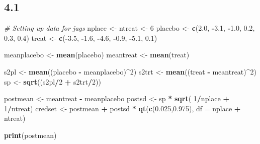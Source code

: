 \documentclass[
]{article}
\newenvironment{Shaded}{\begin{snugshade}}{\end{snugshade}}
\newcommand{\AttributeTok}[1]{\textcolor[rgb]{0.13,0.29,0.53}{#1}}
\newcommand{\CommentTok}[1]{\textcolor[rgb]{0.56,0.35,0.01}{\textit{#1}}}
\newcommand{\DecValTok}[1]{\textcolor[rgb]{0.00,0.00,0.81}{#1}}
\newcommand{\FloatTok}[1]{\textcolor[rgb]{0.00,0.00,0.81}{#1}}
\newcommand{\FunctionTok}[1]{\textcolor[rgb]{0.13,0.29,0.53}{\textbf{#1}}}
\newcommand{\NormalTok}[1]{#1}
\newcommand{\OtherTok}[1]{\textcolor[rgb]{0.56,0.35,0.01}{#1}}
\newcommand{\SpecialCharTok}[1]{\textcolor[rgb]{0.81,0.36,0.00}{\textbf{#1}}}
\begin{document}
\subsection{4.1}\label{section-1}

\begin{Shaded}
\begin{Highlighting}[]
  \CommentTok{\# Setting up data for jags}
\NormalTok{  nplace }\OtherTok{\textless{}{-}}\NormalTok{ ntreat }\OtherTok{\textless{}{-}} \DecValTok{6}
\NormalTok{  placebo }\OtherTok{\textless{}{-}} \FunctionTok{c}\NormalTok{(}\FloatTok{2.0}\NormalTok{, }\SpecialCharTok{{-}}\FloatTok{3.1}\NormalTok{, }\SpecialCharTok{{-}}\FloatTok{1.0}\NormalTok{, }\FloatTok{0.2}\NormalTok{, }\FloatTok{0.3}\NormalTok{, }\FloatTok{0.4}\NormalTok{)}
\NormalTok{  treat    }\OtherTok{\textless{}{-}} \FunctionTok{c}\NormalTok{(}\SpecialCharTok{{-}}\FloatTok{3.5}\NormalTok{, }\SpecialCharTok{{-}}\FloatTok{1.6}\NormalTok{, }\SpecialCharTok{{-}}\FloatTok{4.6}\NormalTok{, }\SpecialCharTok{{-}}\FloatTok{0.9}\NormalTok{, }\SpecialCharTok{{-}}\FloatTok{5.1}\NormalTok{, }\FloatTok{0.1}\NormalTok{)}
   
\NormalTok{  meanplacebo }\OtherTok{\textless{}{-}} \FunctionTok{mean}\NormalTok{(placebo)}
\NormalTok{  meantreat }\OtherTok{\textless{}{-}} \FunctionTok{mean}\NormalTok{(treat)}
  
\NormalTok{  s2pl   }\OtherTok{\textless{}{-}} \FunctionTok{mean}\NormalTok{((placebo }\SpecialCharTok{{-}}\NormalTok{ meanplacebo)}\SpecialCharTok{\^{}}\DecValTok{2}\NormalTok{)}
\NormalTok{  s2trt   }\OtherTok{\textless{}{-}} \FunctionTok{mean}\NormalTok{((treat }\SpecialCharTok{{-}}\NormalTok{ meantreat)}\SpecialCharTok{\^{}}\DecValTok{2}\NormalTok{)}
\NormalTok{  sp    }\OtherTok{\textless{}{-}} \FunctionTok{sqrt}\NormalTok{((s2pl}\SpecialCharTok{/}\DecValTok{2} \SpecialCharTok{+}\NormalTok{ s2trt}\SpecialCharTok{/}\DecValTok{2}\NormalTok{))}

\NormalTok{  postmean }\OtherTok{\textless{}{-}}\NormalTok{ meantreat }\SpecialCharTok{{-}}\NormalTok{ meanplacebo}
\NormalTok{  postsd }\OtherTok{\textless{}{-}}\NormalTok{ sp }\SpecialCharTok{*} \FunctionTok{sqrt}\NormalTok{( }\DecValTok{1}\SpecialCharTok{/}\NormalTok{nplace }\SpecialCharTok{+} \DecValTok{1}\SpecialCharTok{/}\NormalTok{ntreat)}
\NormalTok{  credset }\OtherTok{\textless{}{-}}\NormalTok{ postmean }\SpecialCharTok{+}\NormalTok{ postsd }\SpecialCharTok{*} \FunctionTok{qt}\NormalTok{(}\FunctionTok{c}\NormalTok{(}\FloatTok{0.025}\NormalTok{,}\FloatTok{0.975}\NormalTok{), }\AttributeTok{df =}\NormalTok{ nplace }\SpecialCharTok{+}\NormalTok{ ntreat)}

  \FunctionTok{print}\NormalTok{(postmean)}
\end{Highlighting}
\end{Shaded}
\end{document}
